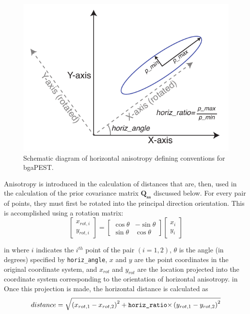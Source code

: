 \documentclass[11pt,oneside,onecolumn]{usgsreport}
\begin{document}
\begin{appendix}
\begin{bibunit}
\begin{figure}[!t]
\begin{center}\includegraphics{figures/anisotropy}\end{center}

\caption{\label{fig:anisotropy}Schematic diagram of horizontal anisotropy
defining conventions for bgaPEST. }
\end{figure}


Anisotropy is introduced in the calculation of distances that are,
then, used in the calculation of the prior covariance matrix $\mathbf{Q_{ss}}$
discussed below. For every pair of points, they must first be rotated
into the principal direction orientation. This is accomplished using
a rotation matrix:
\[
\left[\begin{array}{c}
x_{rot,i}\\
y_{rot,i}
\end{array}\right]=\left[\begin{array}{cc}
\cos\theta & -\sin\theta\\
\sin\theta & \cos\theta
\end{array}\right]\left[\begin{array}{c}
x_{i}\\
y_{i}
\end{array}\right]
\]

 in
where $i$ indicates the $i^{th}$ point of the pair $\left(i=1,2\right)$,
$\theta$ is the angle (in degrees) specified by \texttt{horiz\_angle},
$x$ and $y$ are the point coordinates in the original coordinate
system, and $x_{rot}$ and $y_{rot}$ are the location projected into
the coordinate system corresponding to the orientation of horizontal
anisotropy. 
 in
Once this projection is made, the horizontal distance is calculated
as
\[
distance=\sqrt{\left(x_{rot,1}-x_{rot,2}\right)^{2}+\texttt{{horiz\_ratio}\ensuremath{\times}}\left(y_{rot,1}-y_{rot,2}\right)^{2}}
\]



\end{bibunit}
\end{appendix}
\end{document}
